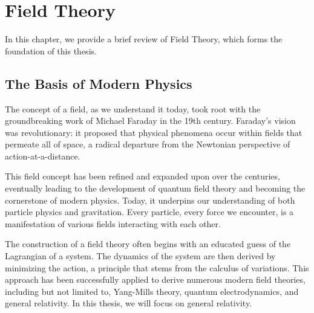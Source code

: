 \chapter{Field Theory}

In this chapter, we provide a brief review of Field Theory, which forms the foundation of this thesis.

\section{The Basis of Modern Physics}

The concept of a field, as we understand it today, took root with the groundbreaking work of Michael Faraday in the 19th century. Faraday's vision was revolutionary: it proposed that physical phenomena occur within fields that permeate all of space, a radical departure from the Newtonian perspective of action-at-a-distance.

This field concept has been refined and expanded upon over the centuries, eventually leading to the development of quantum field theory and becoming the cornerstone of modern physics. Today, it underpins our understanding of both particle physics and gravitation. Every particle, every force we encounter, is a manifestation of various fields interacting with each other.

The construction of a field theory often begins with an educated guess of the Lagrangian of a system. The dynamics of the system are then derived by minimizing the action, a principle that stems from the calculus of variations. This approach has been successfully applied to derive numerous modern field theories, including but not limited to, Yang-Mills theory, quantum electrodynamics, and general relativity. In this thesis, we will focus on general relativity.

